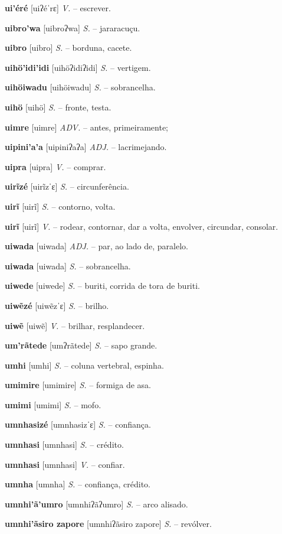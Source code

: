 \textbf{ui'éré} [uiʔéˈrɛ] \textit{V.} -- escrever.

\textbf{uibro'wa} [uibroʔwa] \textit{S.} -- jararacuçu.

\textbf{uibro} [uibro] \textit{S.} -- borduna, cacete.

\textbf{uihö'idi'idi} [uihöʔidiʔidi] \textit{S.} -- vertigem.

\textbf{uihöiwadu} [uihöiwadu] \textit{S.} -- sobrancelha.

\textbf{uihö} [uihö] \textit{S.} -- fronte, testa.

\textbf{uimre} [uimre] \textit{ADV.} -- antes, primeiramente;

\textbf{uipini'a'a} [uipiniʔaʔa] \textit{ADJ.} -- lacrimejando.

\textbf{uipra} [uipra] \textit{V.} -- comprar.

\textbf{uirĩzé} [uirĩzˈɛ] \textit{S.} -- circunferência.

\textbf{uirĩ} [uirĩ] \textit{S.} -- contorno, volta.

\textbf{uirĩ} [uirĩ] \textit{V.} -- rodear, contornar, dar a volta, envolver, circundar, consolar.

\textbf{uiwada} [uiwada] \textit{ADJ.} -- par, ao lado de, paralelo.

\textbf{uiwada} [uiwada] \textit{S.} -- sobrancelha.

\textbf{uiwede} [uiwede] \textit{S.} -- buriti, corrida de tora de buriti.

\textbf{uiwẽzé} [uiwẽzˈɛ] \textit{S.} -- brilho.

\textbf{uiwẽ} [uiwẽ] \textit{V.} -- brilhar, resplandecer.

\textbf{um'rãtede} [umʔrãtede] \textit{S.} -- sapo grande.

\textbf{umhi} [umhi] \textit{S.} -- coluna vertebral, espinha.

\textbf{umimire} [umimire] \textit{S.} -- formiga de asa.

\textbf{umimi} [umimi] \textit{S.} -- mofo.

\textbf{umnhasizé} [umnhasizˈɛ] \textit{S.} -- confiança.

\textbf{umnhasi} [umnhasi] \textit{S.} -- crédito.

\textbf{umnhasi} [umnhasi] \textit{V.} -- confiar.

\textbf{umnha} [umnha] \textit{S.} -- confiança, crédito.

\textbf{umnhi'ã'umro} [umnhiʔãʔumro] \textit{S.} -- arco alisado.

\textbf{umnhi'ãsiro zapore} [umnhiʔãsiro zapore] \textit{S.} -- revólver.

